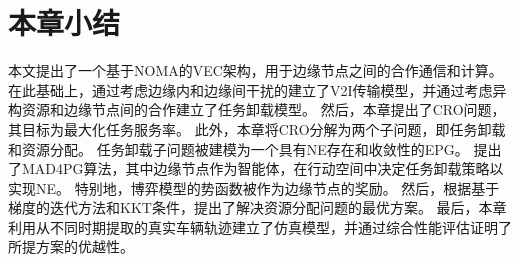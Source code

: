 \section{本章小结}\label{section 4-6}

本文提出了一个基于NOMA的VEC架构，用于边缘节点之间的合作通信和计算。
在此基础上，通过考虑边缘内和边缘间干扰的建立了V2I传输模型，并通过考虑异构资源和边缘节点间的合作建立了任务卸载模型。
然后，本章提出了CRO问题，其目标为最大化任务服务率。
此外，本章将CRO分解为两个子问题，即任务卸载和资源分配。
任务卸载子问题被建模为一个具有NE存在和收敛性的EPG。
提出了MAD4PG算法，其中边缘节点作为智能体，在行动空间中决定任务卸载策略以实现NE。
特别地，博弈模型的势函数被作为边缘节点的奖励。
然后，根据基于梯度的迭代方法和KKT条件，提出了解决资源分配问题的最优方案。
最后，本章利用从不同时期提取的真实车辆轨迹建立了仿真模型，并通过综合性能评估证明了所提方案的优越性。

